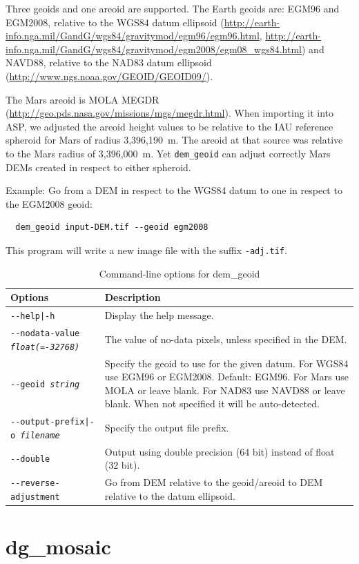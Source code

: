 Three geoids and one areoid are supported. The Earth geoids are: EGM96
and EGM2008, relative to the WGS84 datum ellipsoid
(\url{http://earth-info.nga.mil/GandG/wgs84/gravitymod/egm96/egm96.html},
\url{http://earth-info.nga.mil/GandG/wgs84/gravitymod/egm2008/egm08_wgs84.html})
and NAVD88, relative to the NAD83 datum ellipsoid
(\url{http://www.ngs.noaa.gov/GEOID/GEOID09/}).

The Mars areoid is MOLA MEGDR
(\url{http://geo.pds.nasa.gov/missions/mgs/megdr.html}). When importing
it into ASP, we adjusted the areoid height values to be relative to
the IAU reference spheroid for Mars of radius 3,396,190~m. The areoid at that source was
relative to the Mars radius of 3,396,000~m. Yet \texttt{dem\_geoid} can adjust
correctly Mars DEMs created in respect to either spheroid.

Example: Go from a DEM in respect to the WGS84 datum to one in respect to the EGM2008 geoid:
\begin{verbatim}
  dem_geoid input-DEM.tif --geoid egm2008
\end{verbatim}
This program will write a new image file with the suffix {\tt *-adj.tif}.

\begin{longtable}{|l|p{10cm}|}
\caption{Command-line options for dem\_geoid}
\label{tbl:demgeoid}
\endfirsthead
\endhead
\endfoot
\endlastfoot
\hline
Options & Description \\ \hline \hline
\texttt{-\/-help|-h} & Display the help message.\\ \hline
\texttt{-\/-nodata-value \textit{float(=-32768)}} & The value of no-data pixels, unless specified in the DEM. \\ \hline
\texttt{-\/-geoid \textit{string}} &Specify the geoid to use for the given datum. For WGS84 use EGM96 or EGM2008. Default: EGM96. For Mars use MOLA or leave blank. For NAD83 use NAVD88 or leave blank. When not specified it will be auto-detected. \\ \hline
\texttt{-\/-output-prefix|-o \textit{filename}} & Specify the output file prefix. \\ \hline
\texttt{-\/-double} & Output using double precision (64 bit) instead of float (32 bit).\\ \hline
\texttt{-\/-reverse-adjustment} & Go from DEM relative to the geoid/areoid to DEM relative to the datum ellipsoid.\\ \hline
\end{longtable}

\section{dg\_mosaic}
\label{dgmosaic}

